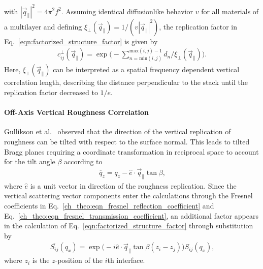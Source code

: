 with $|\vec{q}_\parallel|^2 = 4 \pi^2 f^2$. Assuming identical diffusionlike behavior $v$ for all materials of a multilayer and defining $\xi_\perp(\vec{q}_\parallel) = 1/(v |\vec{q}_\parallel|^2)$, the replication factor in Eq.~\eqref{eqn:factorized_structure_factor} is given by
\begin{align}
c_{ij}^\perp(\vec{q}_\parallel) =  \exp\Bigg(-\sum \limits_{n = \text{min}(i,j)}^{\text{max}(i,j)-1}d_n/\xi_\perp(\vec{q}_\parallel) \Bigg)\text{.}
\end{align}
Here, $\xi_\perp(\vec{q}_\parallel)$ can be interpreted as a spatial frequency dependent vertical correlation length, describing the distance perpendicular to the stack until the replication factor decreased to $1/e$.

\paragraph{Off-Axis Vertical Roughness Correlation}
Gullikson et al.~\cite{gullikson_asymmetric_1999} observed that the direction of the vertical replication of roughness can be tilted with respect to the surface normal. This leads to tilted Bragg planes requiring a coordinate transformation in reciprocal space to account for the tilt angle $\beta$ according to
\begin{align}
\overline{q}_z = q_z - \hat{e} \cdot \vec{q}_\parallel   \tan \beta\text{,}
\end{align}
where $\hat{e}$ is a unit vector in direction of the roughness replication. Since the vertical scattering vector components enter the calculations through the Fresnel coefficients in Eq.~\eqref{ch_theo:eqn_fresnel_reflection_coefficient} and Eq.~\eqref{ch_theo:eqn_fresnel_transmission_coefficient}, an additional factor appears in the calculation of Eq.~\eqref{eqn:factorized_structure_factor} through substitution by
\begin{align}
\overline{S_{ij}}(q_x) = \exp\Big(-i \hat{e} \cdot \vec{q}_\parallel \tan \beta (z_i-z_j)\Big)  S_{ij}(q_x) \text{,} \label{eqn:tilt_correction}
\end{align}
where $z_i$ is the $z$-position of the $i$th interface.

